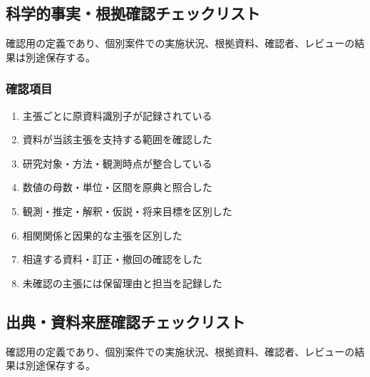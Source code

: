 \documentclass[a4paper,11pt]{article}
\begin{document}
\subsection{科学的事実・根拠確認チェックリスト}
\par 確認用の定義であり、個別案件での実施状況、根拠資料、確認者、レビューの結果は別途保存する。\par\medskip
\subsubsection*{確認項目}
\begin{enumerate}[leftmargin=2em,itemsep=0.3em]
\item 主張ごとに原資料識別子が記録されている\par
\item 資料が当該主張を支持する範囲を確認した\par
\item 研究対象・方法・観測時点が整合している\par
\item 数値の母数・単位・区間を原典と照合した\par
\item 観測・推定・解釈・仮説・将来目標を区別した\par
\item 相関関係と因果的な主張を区別した\par
\item 相違する資料・訂正・撤回の確認をした\par
\item 未確認の主張には保留理由と担当を記録した\par
\end{enumerate}
\subsection{出典・資料来歴確認チェックリスト}
\par 確認用の定義であり、個別案件での実施状況、根拠資料、確認者、レビューの結果は別途保存する。\par\medskip
\end{document}
